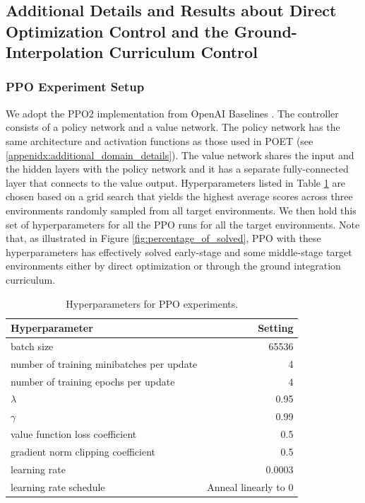 \documentclass{article}
\newcommand{\ks}[1]{\comments{\textcolor{purple}{[Ken: #1]}}}
\newcommand{\rwang}[1]{\comments{\textcolor{blue}{[Rui: #1]}}}
\newcommand{\comments}[1]{#1} %
\begin{document}
\subsection{Additional Details and Results about Direct Optimization Control and the Ground-Interpolation Curriculum Control}

\label{appendix:ground-integ-curriculum}

\subsubsection{PPO Experiment Setup}
\label{appendix:PPO_setup}
We adopt the PPO2 implementation from OpenAI Baselines \cite{dhariwal2017openai}. The controller consists of a policy network and a value network. The policy network has the same architecture and activation functions as those used in POET (see \ref{appenidx:additional_domain_details}).  The value network shares the input and the hidden layers with the policy network and it has a separate fully-connected layer that connects to the value output. Hyperparameters listed in Table \ref{tab:ppo_hyperparams} are chosen based on a grid search that yields the highest average scores across three environments randomly sampled from all target environments. We then hold this set of hyperparameters for all the PPO runs for all the target environments. Note that, as illustrated in Figure \ref{fig:percentage_of_solved}, PPO with these hyperparameters has effectively solved early-stage and some middle-stage target environments either by direct optimization or through the ground integration curriculum.   

\begin{table}[htp]
\centering
\begin{tabular}{lr}
\toprule
Hyperparameter & Setting \\
\midrule
batch size & 65536 \\
number of training minibatches per update & 4 \\
number of training epochs per update & 4 \\
$\lambda$ & 0.95 \\
$\gamma$ & 0.99 \\
value function loss coefficient & 0.5 \\
gradient norm clipping coefficient & 0.5 \\
learning rate & 0.0003 \\
learning rate schedule &  Anneal linearly to 0 \\
\bottomrule
\end{tabular}
\caption{Hyperparameters for PPO experiments.}
\label{tab:ppo_hyperparams}
\end{table}
\end{document}
